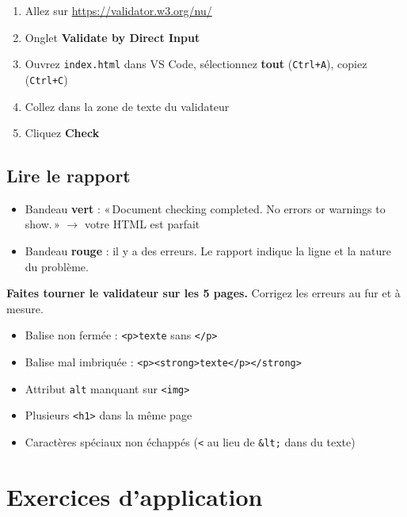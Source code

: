 \documentclass[11pt,a4paper]{article}
\newcommand{\cmark}{\ding{51}}
\begin{document}
\begin{enumerate}[nosep]
    \item Allez sur \url{https://validator.w3.org/nu/}
    \item Onglet \textbf{Validate by Direct Input}
    \item Ouvrez \texttt{index.html} dans VS Code, sélectionnez \textbf{tout} (\texttt{Ctrl+A}), copiez (\texttt{Ctrl+C})
    \item Collez dans la zone de texte du validateur
    \item Cliquez \textbf{Check}
\end{enumerate}

\subsection{Lire le rapport}

\begin{itemize}[leftmargin=*,nosep]
    \item Bandeau \textbf{vert} : «\,Document checking completed. No errors or warnings to show.\,» $\to$ votre HTML est parfait \cmark
    \item Bandeau \textbf{rouge} : il y a des erreurs. Le rapport indique la ligne et la nature du problème.
\end{itemize}

\textbf{Faites tourner le validateur sur les 5 pages.} Corrigez les
erreurs au fur et à mesure.

\begin{infobox}
\begin{itemize}[leftmargin=*,nosep]
    \item Balise non fermée : \texttt{<p>texte} sans \texttt{</p>}
    \item Balise mal imbriquée : \texttt{<p><strong>texte</p></strong>}
    \item Attribut \texttt{alt} manquant sur \texttt{<img>}
    \item Plusieurs \texttt{<h1>} dans la même page
    \item Caractères spéciaux non échappés (\texttt{<} au lieu de \texttt{\&lt;} dans du texte)
\end{itemize}
\end{infobox}

\newpage

\section{Exercices d'application}
\end{document}
